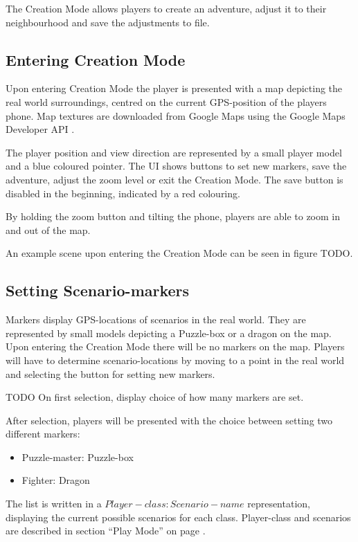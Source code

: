 \documentclass{sigchi-ext}
\begin{document}
The Creation Mode allows players to create an adventure, adjust it to their neighbourhood and save the adjustments to file.


\subsection{Entering Creation Mode}

Upon entering Creation Mode the player is presented with a map depicting the real world surroundings, centred on the current GPS-position of the players phone. Map textures are downloaded from Google Maps \cite{googlemaps} using the Google Maps Developer API \cite{googlemapsAPI}.

The player position and view direction are represented by a small player model and a blue coloured pointer. The UI shows buttons to set new markers, save the adventure, adjust the zoom level or exit the Creation Mode. The save button is disabled in the beginning, indicated by a red colouring.

By holding the zoom button and tilting the phone, players are able to zoom in and out of the map.

An example scene upon entering the Creation Mode can be seen in figure TODO.

\subsection{Setting Scenario-markers}

Markers display GPS-locations of scenarios in the real world. They are represented by small models depicting a Puzzle-box or a dragon on the map. Upon entering the Creation Mode there will be no markers on the map. Players will have to determine scenario-locations by moving to a point in the real world and selecting the button for setting new markers.

TODO On first selection, display choice of how many markers are set.

After selection, players will be presented with the choice between setting two different markers:
\begin{itemize}\compresslist%
	\item Puzzle-master: Puzzle-box
	\item Fighter: Dragon
\end{itemize}
The list is written in a $Player-class: Scenario-name$ representation, displaying the current possible scenarios for each class. Player-class and scenarios are described in section ``Play Mode'' on page \pageref{sec:Play}.
\end{document}
